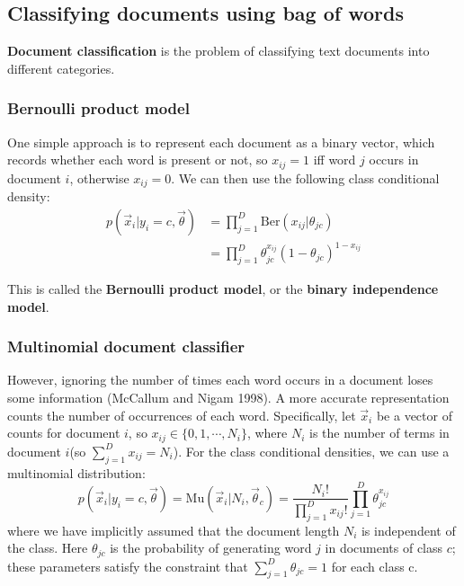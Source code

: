 {\subsection{Classifying documents using bag of words}
\textbf{Document classification} is the problem of classifying text documents into different categories.


\subsubsection{Bernoulli product model}
One simple approach is to represent each document as a binary vector, which records whether each word is present or not, so $x_{ij} =1$ iff word $j$ occurs in document $i$, otherwise $x_{ij}=0$. We can then use the following class conditional density:
\begin{equation}\begin{split}
p(\vec{x}_i|y_i=c,\vec{\theta}) & =\prod\limits_{j=1}^D \mathrm{Ber}(x_{ij}|\theta_{jc}) \\
  & =\prod\limits_{j=1}^D \theta_{jc}^{x_{ij}}(1-\theta_{jc})^{1-x_{ij}}
\end{split}\end{equation}

This is called the \textbf{Bernoulli product model}, or the \textbf{binary independence model}.

\subsubsection{Multinomial document classifier}
However, ignoring the number of times each word occurs in a document loses some information (McCallum and Nigam 1998). A more accurate representation counts the number of occurrences of each word. Specifically, let $\vec{x}_i$ be a vector of counts for document $i$, so $x_{ij} \in \{0,1,\cdots,N_i\}$, where $N_i$ is the number of terms in document $i$(so $\sum\limits_{j=1}^D x_{ij}=N_i$). For the class conditional densities, we can use a multinomial distribution:
\begin{equation}\label{eqn:Multinomial-document-classifier}
p(\vec{x}_i|y_i=c,\vec{\theta})=\text{Mu}(\vec{x}_i|N_i,\vec{\theta}_c)=\dfrac{N_i!}{\prod_{j=1}^D x_{ij}!}\prod\limits_{j=1}^D \theta_{jc}^{x_{ij}}
\end{equation}
where we have implicitly assumed that the document length $N_i$ is independent of the class. Here $θ_{jc}$ is the probability of generating word $j$ in documents of class $c$; these parameters satisfy the constraint that $\sum_{j=1}^D \theta_{jc}=1$ for each class c.

}
